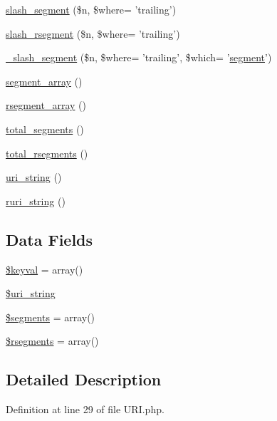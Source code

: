 \begin{DoxyCompactItemize}
\item 
\hyperlink{class_c_i___u_r_i_ac16fc32f9085c8ccf4d8eeae78765ae8}{slash\-\_\-segment} (\$n, \$where= 'trailing')
\item 
\hyperlink{class_c_i___u_r_i_a644ee9ec883346bab8ba8819ee3ebf98}{slash\-\_\-rsegment} (\$n, \$where= 'trailing')
\item 
\hyperlink{class_c_i___u_r_i_aeb479c7fb188fad2720246af4827ea9a}{\-\_\-slash\-\_\-segment} (\$n, \$where= 'trailing', \$which= '\hyperlink{class_c_i___u_r_i_a6f0bc9309bced907b54cf2178b359b9c}{segment}')
\item 
\hyperlink{class_c_i___u_r_i_ac0db37475b7a41e156f2e9375a2b7cc6}{segment\-\_\-array} ()
\item 
\hyperlink{class_c_i___u_r_i_aaac2da0a6641a4a874a178442eb99624}{rsegment\-\_\-array} ()
\item 
\hyperlink{class_c_i___u_r_i_a5805c40e1c916e7b00b49f131765ac1c}{total\-\_\-segments} ()
\item 
\hyperlink{class_c_i___u_r_i_aead39329dc096b94eef0955fdcdd635f}{total\-\_\-rsegments} ()
\item 
\hyperlink{class_c_i___u_r_i_ac7a3f945c14cc37f89b6d9d1c7a037a4}{uri\-\_\-string} ()
\item 
\hyperlink{class_c_i___u_r_i_a53a97a8b68f500980b84e3b060400221}{ruri\-\_\-string} ()
\end{DoxyCompactItemize}
\subsection*{Data Fields}
\begin{DoxyCompactItemize}
\item 
\hyperlink{class_c_i___u_r_i_ae15942155aae4760439f552ad1fc3c34}{\$keyval} = array()
\item 
\hyperlink{class_c_i___u_r_i_ab908b3e655463a05e8a646c965ca4e53}{\$uri\-\_\-string}
\item 
\hyperlink{class_c_i___u_r_i_a8d7f597e2b6cf2aaef663822d1b96a82}{\$segments} = array()
\item 
\hyperlink{class_c_i___u_r_i_abf60189292b5fda02cdf36e5d7417a33}{\$rsegments} = array()
\end{DoxyCompactItemize}


\subsection{Detailed Description}


Definition at line 29 of file U\-R\-I.\-php.



